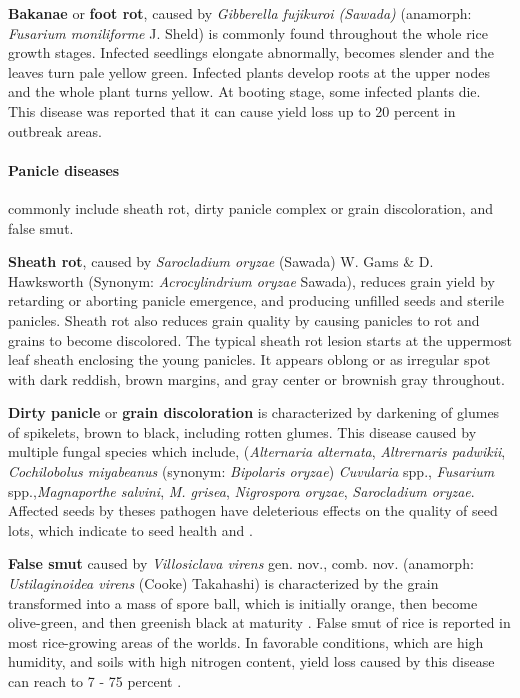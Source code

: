 \textbf{Bakanae} or \textbf{foot rot}, caused by \textit{Gibberella fujikuroi (Sawada)} (anamorph: \textit{Fusarium moniliforme} J. Sheld) is commonly found throughout the whole rice growth stages.  Infected seedlings elongate abnormally, becomes slender and the leaves turn pale yellow green. Infected plants develop roots at the upper nodes and the whole plant turns yellow. At booting stage, some infected plants die. This disease was reported that it can cause yield loss up to 20 percent in outbreak areas.

\paragraph{Panicle diseases} commonly include sheath rot, dirty panicle complex or grain discoloration, and false smut.

\textbf{Sheath rot}, caused by \textit{Sarocladium oryzae} (Sawada) W. Gams \& D. Hawksworth (Synonym: \textit{Acrocylindrium oryzae} Sawada), reduces grain yield by retarding or aborting panicle emergence, and producing unfilled seeds and sterile panicles. Sheath rot also reduces grain quality by causing panicles to rot and grains to become discolored. The typical sheath rot lesion starts at the uppermost leaf sheath enclosing the young panicles. It appears oblong or as irregular spot with dark reddish, brown margins, and gray center or brownish gray throughout. 

\textbf{Dirty panicle} or \textbf{grain discoloration} is characterized by darkening of glumes of spikelets, brown to black, including rotten glumes. This disease caused by multiple fungal species which include, (\textit{Alternaria alternata}, \textit{Altrernaris padwikii}, \textit{Cochilobolus miyabeanus} (synonym: \textit{Bipolaris oryzae}) \textit{Cuvularia} spp., \textit {Fusarium} spp.,\textit{Magnaporthe salvini}, \textit{M. grisea}, \textit{Nigrospora oryzae}, \textit{Sarocladium oryzae}. Affected seeds by theses pathogen have deleterious effects on the quality of seed lots, which indicate to seed health \citep{Ou_1985_Rice} and \citep{Mew_2002_Handbook}.
 
\textbf{False smut} caused by \textit{Villosiclava virens} gen. nov., comb. nov. (anamorph: \textit{Ustilaginoidea virens} (Cooke) Takahashi) is characterized by the grain transformed into a mass of spore ball, which is initially orange, then become olive-green, and then greenish black at maturity \citep{Tanaka_2008_Villosiclava}. False smut of rice is reported in most rice-growing areas of the worlds. In favorable conditions, which are high humidity, and soils with high nitrogen content, yield loss caused by this disease can reach to 7 - 75 percent \citep{Ou_1985_Rice}. 

